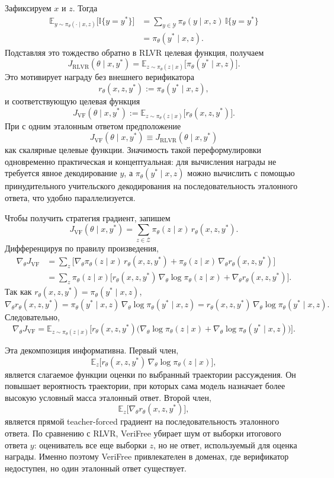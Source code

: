 Зафиксируем \(x\) и \(z\). Тогда
\begin{align*}
 \mathbb{E}_{y\sim\pi_{\theta}(\cdot\mid x,z)}
 \big[\mathbb{I}\{y=y^{*}\}\big]
 & =
 \sum_{y\in\mathcal{Y}}
 \pi_{\theta}(y\mid x,z)\,\mathbb{I}\{y=y^{*}\} \\
 & =
 \pi_{\theta}(y^{*}\mid x,z).
\end{align*}
Подставляя это тождество обратно в RLVR целевая функция, получаем
\[
 J_{\mathrm{RLVR}}(\theta\mid x,y^{*})
 =
 \mathbb{E}_{z\sim\pi_{\theta}(z\mid x)}
 \big[\pi_{\theta}(y^{*}\mid x,z)\big].
\]
Это мотивирует награду без внешнего верификатора
\[
 r_{\theta}(x,z,y^{*}) := \pi_{\theta}(y^{*}\mid x,z),
\]
и соответствующую целевая функция
\[
 J_{\mathrm{VF}}(\theta\mid x,y^{*})
 :=
 \mathbb{E}_{z\sim\pi_{\theta}(z\mid x)}
 \big[r_{\theta}(x,z,y^{*})\big].
\]
При с одним эталонным ответом предположение
\[
 J_{\mathrm{VF}}(\theta\mid x,y^{*}) \equiv J_{\mathrm{RLVR}}(\theta\mid x,y^{*})
\]
как скалярные целевые функции. Значимость такой переформулировки одновременно практическая и концептуальная: для вычисления награды не требуется явное декодирование \(y\), а \(\pi_{\theta}(y^{*}\mid x,z)\) можно вычислить с помощью принудительного учительского декодирования на последовательность эталонного ответа, что удобно параллелизуется.

Чтобы получить стратегия градиент, запишем
\[
 J_{\mathrm{VF}}(\theta\mid x,y^{*})
 =
 \sum_{z\in\mathcal{Z}} \pi_{\theta}(z\mid x)\,r_{\theta}(x,z,y^{*}).
\]
Дифференцируя по правилу произведения,
\begin{align*}
 \nabla_{\theta}J_{\mathrm{VF}}
 & =
 \sum_{z}
 \Big[
 \nabla_{\theta}\pi_{\theta}(z\mid x)\,r_{\theta}(x,z,y^{*})
 +
 \pi_{\theta}(z\mid x)\,\nabla_{\theta}r_{\theta}(x,z,y^{*})
 \Big] \\
 & =
 \sum_{z}\pi_{\theta}(z\mid x)
 \Big[
 r_{\theta}(x,z,y^{*})\,\nabla_{\theta}\log\pi_{\theta}(z\mid x)
 +
 \nabla_{\theta}r_{\theta}(x,z,y^{*})
 \Big].
\end{align*}
Так как \(r_{\theta}(x,z,y^{*})=\pi_{\theta}(y^{*}\mid x,z)\),
\[
 \nabla_{\theta}r_{\theta}(x,z,y^{*})
 =
 \pi_{\theta}(y^{*}\mid x,z)\,\nabla_{\theta}\log\pi_{\theta}(y^{*}\mid x,z)
 =
 r_{\theta}(x,z,y^{*})\,\nabla_{\theta}\log\pi_{\theta}(y^{*}\mid x,z).
\]
Следовательно,
\[
 \nabla_{\theta}J_{\mathrm{VF}}
 =
 \mathbb{E}_{z\sim\pi_{\theta}(z\mid x)}\Big[
 r_{\theta}(x,z,y^{*})
 \big(
 \nabla_{\theta}\log\pi_{\theta}(z\mid x)
 +
 \nabla_{\theta}\log\pi_{\theta}(y^{*}\mid x,z)
 \big)
 \Big].
\]

Эта декомпозиция информативна. Первый член,
\[
 \mathbb{E}_{z}\big[r_{\theta}(x,z,y^{*})\,\nabla_{\theta}\log\pi_{\theta}(z\mid x)\big],
\]
является слагаемое функции оценки по выбранный траектории рассуждения. Он повышает вероятность траектории, при которых сама модель назначает более высокую условный масса эталонный ответ. Второй член,
\[
 \mathbb{E}_{z}\big[\nabla_{\theta}r_{\theta}(x,z,y^{*})\big],
\]
является прямой teacher-forced градиент на последовательность эталонного ответа. По сравнению с RLVR, VeriFree убирает шум от выборки итогового ответа \(y\): оцениватель все еще выборки \(z\), но не ответ, используемый для оценка награды. Именно поэтому VeriFree привлекателен в доменах, где верификатор недоступен, но один эталонный ответ существует.

